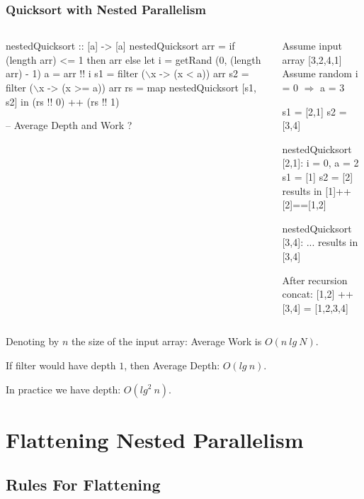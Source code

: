 \documentclass{beamer}
\newcommand{\emp}[1]{\textcolor{DikuRed}{ #1}}
\newcommand{\mymath}[1]{$ #1 $}
\begin{document}
\begin{frame}[fragile,t]
  \frametitle{Quicksort with Nested Parallelism}

\begin{columns}
\begin{colorcode}[fontsize=\scriptsize]
nestedQuicksort :: [a] -> [a]
nestedQuicksort arr = 
  if (length arr) <= 1 then arr else 
  let i = getRand (0, (length arr) - 1)
      a = arr !! i
      s1 = filter (\mymath{\backslash}x -> (x <  a)) arr
      s2 = filter (\mymath{\backslash}x -> (x >= a)) arr
      rs = map nestedQuicksort [s1, s2]
  in  (rs !! 0) ++ (rs !! 1)

-- \alert{Average Depth and Work ?}
\end{colorcode}
\pause
\begin{colorcode}[fontsize=\scriptsize]
Assume input array [3,2,4,1]
Assume random i = 0 \mymath{\Rightarrow} a = 3

s1 = [2,1]
s2 = [3,4]

\emp{nestedQuicksort [2,1]}:
i = 0, a = 2
s1 = [1]
s2 = [2]
results in [1]++[2]==[1,2]

\emp{nestedQuicksort [3,4]}: ...
results in [3,4]

\emp{After recursion concat:}
[1,2] ++ [3,4] = [1,2,3,4]
\end{colorcode}
\end{columns}
\medskip

Denoting by $n$ the size of the input array: Average Work is $O(n \ lg \ N)$.\\
\medskip

If filter would have depth $1$, then Average Depth: $O(lg \ n)$.
\medskip

In practice we have depth: $O(lg^2 \ n)$.

\end{frame}

\section{Flattening Nested Parallelism}

\begin{frame}[fragile]
	\tableofcontents[currentsection]
\end{frame}

\subsection{Rules For Flattening}
\end{document}
